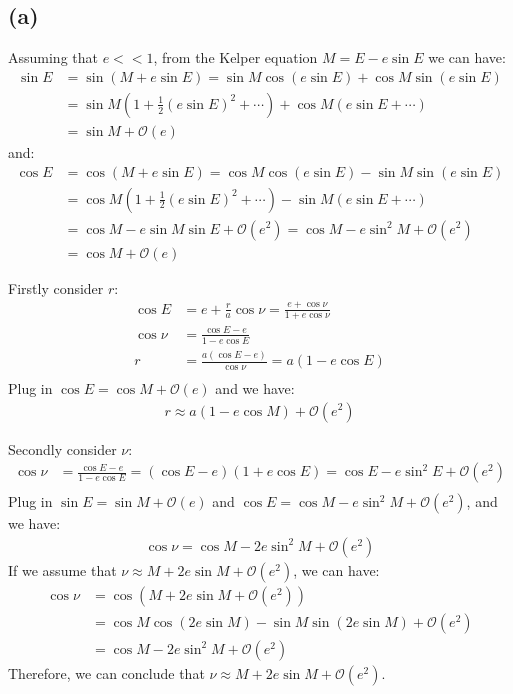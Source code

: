 \documentclass[a4paper,12pt]{article}
\begin{document}
\subsection*{(a)}
Assuming that $e<<1$, from the Kelper equation $M = E - e \sin E$ we can have:
\begin{align*}
    \sin E &= \sin(M + e\sin E) = \sin M \cos(e\sin E) + \cos M \sin(e\sin E) \\
           &= \sin M (1+\frac{1}{2}(e\sin E)^2 +\cdots) + \cos M (e\sin E + \cdots) \\
           &= \sin M + \mathcal{O} (e)
\end{align*}
and:
\begin{align*}
    \cos E &= \cos(M + e\sin E) = \cos M \cos(e\sin E) - \sin M \sin(e\sin E) \\
           &= \cos M (1+\frac{1}{2}(e\sin E)^2 +\cdots) - \sin M (e\sin E + \cdots) \\
           &= \cos M - e\sin M \sin E + \mathcal{O} (e^2) = \cos M - e\sin ^2M + \mathcal{O} (e^2)\\
           &= \cos M + \mathcal{O} (e)
\end{align*}

Firstly consider $r$:
\begin{align*}
    \cos E &= e + \frac{r}{a} \cos \nu = \frac{e + \cos \nu}{1 + e\cos \nu} \\
    \cos \nu &= \frac{\cos E - e}{1 - e\cos E} \\
    r &= \frac{a(\cos E - e)}{\cos \nu} = a (1 - e \cos E) \\
\end{align*}
Plug in $\cos E = \cos M + \mathcal{O} (e)$ and we have:
\begin{align*}
    r \approx  a (1 - e \cos M) + \mathcal{O} (e^2)
\end{align*}

Secondly consider $\nu$:
\begin{align*}
    \cos \nu &= \frac{\cos E - e}{1 - e\cos E}  = (\cos E - e)(1 + e\cos E) = \cos E - e \sin ^2E + \mathcal{O} (e^2)\\
\end{align*}
Plug in $\sin E = \sin M + \mathcal{O} (e)$ and $\cos E = \cos M - e\sin ^2M + \mathcal{O} (e^2)$, and we have:
\begin{align*}
    \cos \nu = \cos M - 2e \sin ^2M + \mathcal{O} (e^2)
\end{align*}
If we assume that $\nu \approx M + 2e\sin M + \mathcal{O} (e^2)$, we can have:
\begin{align*}
    \cos \nu &= \cos (M + 2e\sin M + \mathcal{O} (e^2)) \\
            &= \cos M \cos(2e\sin M) - \sin M \sin(2e\sin M) + \mathcal{O} (e^2) \\
            &= \cos M - 2 e\sin ^2M + \mathcal{O} (e^2)
\end{align*}
Therefore, we can conclude that $\nu \approx M + 2e\sin M + \mathcal{O} (e^2)$.
\end{document}
